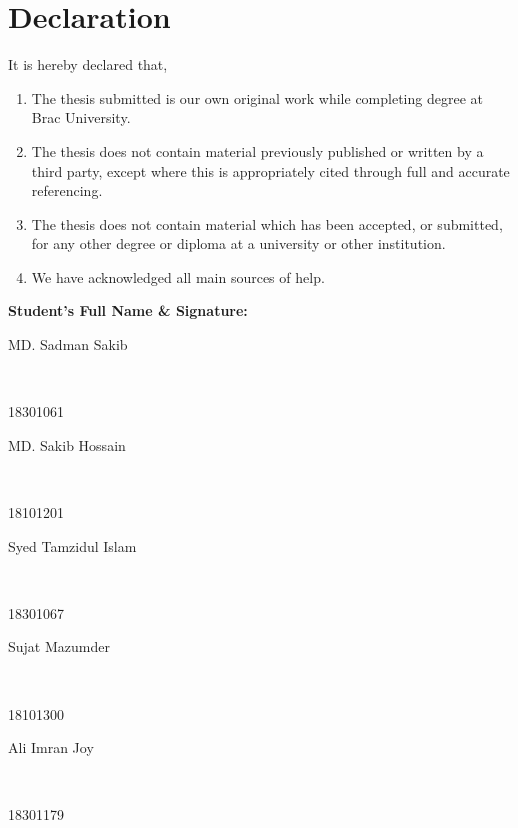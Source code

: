 \newcommand*\wildcard[2][6cm]{\vspace{2cm}\parbox{#1}{\hrulefill\par#2}} 


\section*{Declaration}

It is hereby declared that,

\begin{enumerate} %
  \item The thesis submitted is our own original work while completing degree at Brac University.
  \item The thesis does not contain material previously published or written by a third party, except where this is appropriately cited through full and accurate referencing.
  \item The thesis does not contain material which has been accepted, or submitted, for any other degree or diploma at a university or other institution.
  \item We have acknowledged all main sources of help.
\end{enumerate}

\vspace{1cm}
\textbf{Student’s Full Name \& Signature:} %

\begingroup

    \begin{center}
        \wildcard{\centerline{MD. Sadman Sakib} ~\\ \centerline{18301061}} %
        \hspace{2cm} %
        \wildcard{\centerline{MD. Sakib Hossain} ~\\ \centerline{18101201} }
        \wildcard{\centerline{Syed Tamzidul Islam} ~\\ \centerline{18301067} }
        \hspace{2cm}
        \wildcard{\centerline{Sujat Mazumder} ~\\ \centerline{18101300} }
        \wildcard{\centerline{Ali Imran Joy} ~\\ \centerline{18301179} }
      \end{center}

\endgroup


\pagebreak





